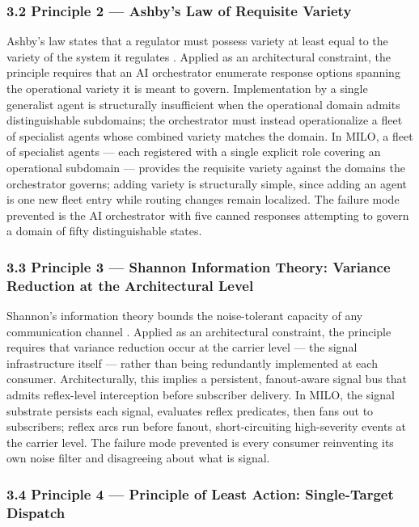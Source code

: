 \subsubsection{3.2 Principle 2 --- Ashby's Law of Requisite
Variety}\label{principle-2-ashbys-law-of-requisite-variety}

Ashby's law states that a regulator must possess variety at least equal
to the variety of the system it regulates \cite{ref6}. Applied as an
architectural constraint, the principle requires that an AI orchestrator
enumerate response options spanning the operational variety it is meant
to govern. Implementation by a single generalist agent is structurally
insufficient when the operational domain admits distinguishable
subdomains; the orchestrator must instead operationalize a fleet of
specialist agents whose combined variety matches the domain. In MILO, a
fleet of specialist agents --- each registered with a single explicit
role covering an operational subdomain --- provides the requisite
variety against the domains the orchestrator governs; adding variety is
structurally simple, since adding an agent is one new fleet entry while
routing changes remain localized. The failure mode prevented is the AI
orchestrator with five canned responses attempting to govern a domain of
fifty distinguishable states.

\subsubsection{3.3 Principle 3 --- Shannon Information Theory: Variance
Reduction at the Architectural
Level}\label{principle-3-shannon-information-theory-variance-reduction-at-the-architectural-level}

Shannon's information theory bounds the noise-tolerant capacity of any
communication channel \cite{ref7}. Applied as an architectural constraint,
the principle requires that variance reduction occur at the carrier
level --- the signal infrastructure itself --- rather than being
redundantly implemented at each consumer. Architecturally, this implies
a persistent, fanout-aware signal bus that admits reflex-level
interception before subscriber delivery. In MILO, the signal substrate
persists each signal, evaluates reflex predicates, then fans out to
subscribers; reflex arcs run before fanout, short-circuiting
high-severity events at the carrier level. The failure mode prevented is
every consumer reinventing its own noise filter and disagreeing about
what is signal.

\subsubsection{3.4 Principle 4 --- Principle of Least Action:
Single-Target
Dispatch}\label{principle-4-principle-of-least-action-single-target-dispatch}

